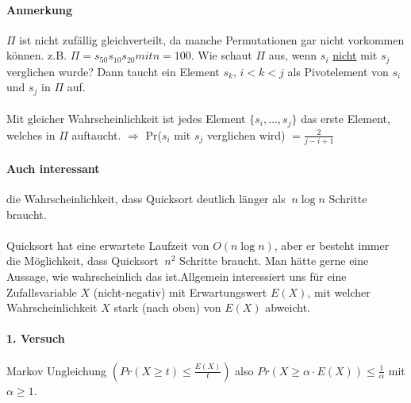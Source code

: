\paragraph*{Anmerkung} $\Pi$ ist nicht zufällig gleichverteilt, da manche Permutationen gar nicht vorkommen können. z.B. $\Pi = s_{50} s_{10} s_{20} mit n=100$. Wie schaut $\Pi$ aus, wenn $s_i$ \underline{nicht} mit $s_j$ verglichen wurde? Dann taucht ein Element $s_k$, $i<k<j$ als Pivotelement von $s_i$ und $s_j$ in $\Pi$ auf.\\


\paragraph*{} Mit gleicher Wahrscheinlichkeit ist jedes Element $\{ s_i,\dots,s_j \}$ das erste Element, welches in $\Pi$ auftaucht. $\Rightarrow$ Pr($s_i$ mit $s_j$ verglichen wird) $= \frac{2}{j-i+1}$

\paragraph*{Auch interessant} die Wahrscheinlichkeit, dass Quicksort deutlich länger als $~n \log n$ Schritte braucht.


\paragraph*{} Quicksort hat eine erwartete Laufzeit von $O(n \log n)$, aber er besteht immer die Möglichkeit, dass Quicksort $~n^2$ Schritte braucht. Man hätte gerne eine Aussage, wie wahrscheinlich das ist.Allgemein interessiert uns für eine Zufallsvariable $X$ (nicht-negativ) mit Erwartungswert $E(X)$, mit welcher Wahrscheinlichkeit $X$ stark (nach oben) von $E(X)$ abweicht. %

\paragraph*{1. Versuch} Markov Ungleichung $(Pr(X \geq t) \leq \frac{E(X)}{t})$ also $Pr(X \geq \alpha \cdot E(X)) \leq \frac{1}{\alpha}$ mit $\alpha \geq 1$.

